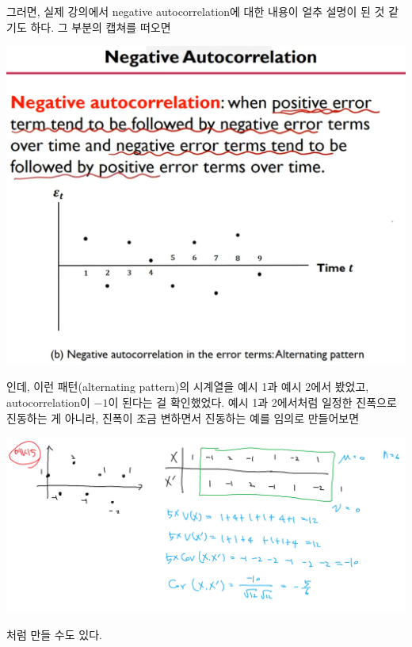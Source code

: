 \documentclass{article}
\begin{document}
그러면, 실제 강의에서 negative autocorrelation에 대한 내용이 얼추 설명이 된 것 같기도 하다.
그 부분의 캡쳐를 떠오면
\begin{center}
\includegraphics[width=.5\textwidth]{negative_autocorrelation}
\end{center}
인데, 이런 패턴(alternating pattern)의 시계열을 예시 1과 예시 2에서 봤었고, autocorrelation이 $-1$이 된다는 걸 확인했었다.
예시 1과 2에서처럼 일정한 진폭으로 진동하는 게 아니라, 진폭이 조금 변하면서 진동하는 예를 임의로 만들어보면
\begin{center}
\includegraphics[width=.6\textwidth]{autocorrelation-3}
\end{center}
처럼 만들 수도 있다.
\end{document}
